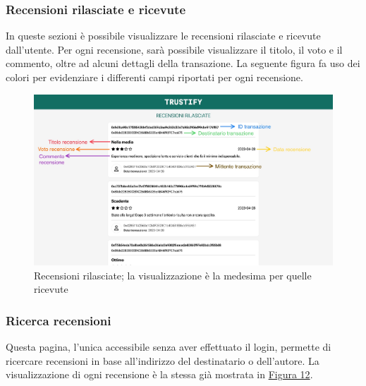 \subsubsection{Recensioni rilasciate e ricevute}
In queste sezioni è possibile visualizzare le recensioni rilasciate e ricevute dall'utente. Per ogni recensione, sarà possibile visualizzare il titolo, il voto e il commento, oltre ad alcuni dettagli della transazione. La seguente figura fa uso dei colori per evidenziare i differenti campi riportati per ogni recensione.

\begin{figure}
    \centering
    \includegraphics[scale=0.18]{src/img/recensioni_rilasciate.jpg}
    \caption{Recensioni rilasciate; la visualizzazione è la medesima per quelle ricevute}\label{fig:recensioni_rilasciate}
\end{figure}

\subsubsection{Ricerca recensioni}
Questa pagina, l'unica accessibile senza aver effettuato il login, permette di ricercare recensioni in base all'indirizzo del destinatario o dell'autore. La visualizzazione di ogni recensione è la stessa già mostrata in \hyperref[fig:recensioni_rilasciate]{Figura 12}.

